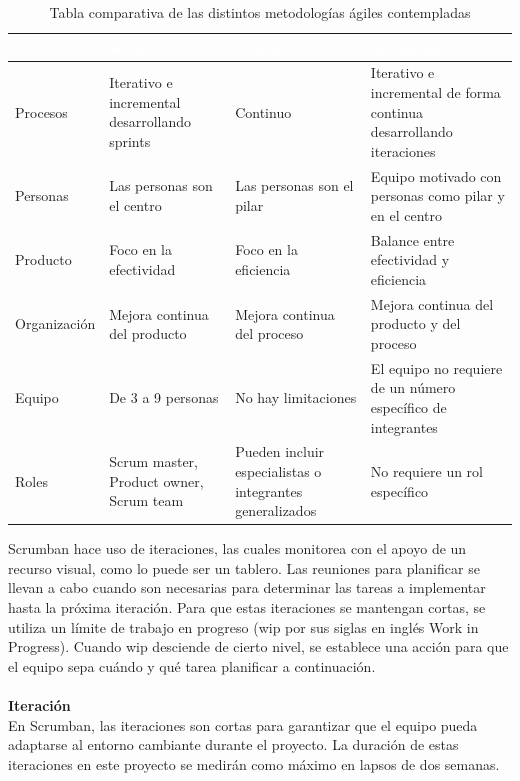 \documentclass[12pt, a4paper, titlepage]{report}
\begin{document}
	    \begin{table}[htbp!]
	    	\begin{tabular}{|m{1.75cm}|m{2.75cm}|m{2.75cm}|m{4.75cm}|}
	    		\hline    			
	    		\rowcolor{guindapoli}
	    		 & \hfil {\textbf{\textcolor{white}{Scrum}}} & \hfil {\textbf{\textcolor{white}{Kanban}}} & \hfil {\textbf{\textcolor{white}{Scrumban}}}\\
	    		\hline
	    		 \hfil Procesos & Iterativo e incremental desarrollando sprints & \hfil Continuo & Iterativo e incremental de forma continua desarrollando iteraciones \\
	    		 \hline
	    		 \hfil Personas & Las personas son el centro & Las personas son el pilar & Equipo motivado con personas como pilar y en el centro \\
	    		 \hline
	    		 \hfil Producto & Foco en la efectividad & Foco en la eficiencia & Balance entre efectividad y eficiencia \\
	    		 \hline
	    		 \hfil Organizaci\'on & Mejora continua del producto & Mejora continua del proceso & Mejora continua del producto y del proceso\\
	    		 \hline
	    		 \hfil Equipo & De 3 a 9 personas & No hay limitaciones & El equipo no requiere de un número específico de integrantes \\
	    		 \hline
	    		 \hfil Roles & Scrum master, Product owner, Scrum team & Pueden incluir especialistas o integrantes generalizados & No requiere un rol específico \\
	    		 \hline
	    	\end{tabular}
	    	\caption[Comparación metodologías ágiles]{Tabla comparativa de las distintos metodologías ágiles contempladas}
	    \end{table}
	    Scrumban hace uso de iteraciones, las cuales monitorea con el apoyo de un recurso visual, como lo puede ser un tablero. Las reuniones para planificar se llevan a cabo cuando son necesarias para determinar las tareas a implementar hasta la próxima iteración. Para que estas iteraciones se mantengan cortas, se utiliza un límite de trabajo en progreso (\acrshort{wip} por sus siglas en inglés Work in Progress). Cuando \acrshort{wip} desciende de cierto nivel, se establece una acción para que el equipo sepa cuándo y qué tarea planificar a continuación.\\\\
	    \textbf{Iteración}\\
	    En Scrumban, las iteraciones son cortas para garantizar que el equipo pueda adaptarse al entorno cambiante durante el proyecto. La duración de estas iteraciones en este proyecto se medirán como máximo en lapsos de dos semanas.\\
\end{document}
